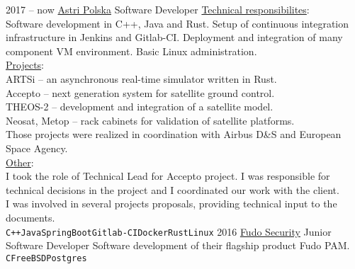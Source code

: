 \documentclass[10pt]{developercv} %
\begin{document}
\begin{entrylist}
	\entry
		{2017 -- now}
		{\href{https://astripolska.pl/}{Astri Polska}}
		{Software Developer}
        {\underline{Technical responsibilites}:\\
        Software development in C++, Java and Rust. Setup of continuous integration infrastructure in Jenkins and Gitlab-CI. Deployment and integration of many component VM environment. Basic Linux administration.\\
        \underline{Projects}:\\
        ARTSi -- an asynchronous real-time simulator written in Rust.\\
        Accepto -- next generation system for satellite ground control.\\
        THEOS-2 -- development and integration of a satellite model.\\
        Neosat, Metop -- rack cabinets for validation of satellite platforms.\\
        Those projects were realized in coordination with Airbus D\&S and European Space Agency.\\
        \underline{Other}:\\
        I took the role of Technical Lead for Accepto project. I was responsible for technical decisions in the project and I coordinated our work with the client.\\
        I was involved in several projects proposals, providing technical input to the documents.
        \\ \texttt{C++}\slashsep\texttt{Java}\slashsep\texttt{SpringBoot}\slashsep\texttt{Gitlab-CI}\slashsep\texttt{Docker}\slashsep\texttt{Rust}\slashsep\texttt{Linux}}
	\entry
		{2016}
		{\href{https://fudosecurity.com/}{Fudo Security}}
		{Junior Software Developer}
	    {Software development of their flagship product Fudo PAM.\\
		\texttt{C}\slashsep\texttt{FreeBSD}\slashsep\texttt{Postgres}}
\end{entrylist}


\begin{minipage}[t]{0.3\textwidth}
\vspace{-\baselineskip}
\begin{barchart}{2.5}
\end{barchart}
\end{minipage}
\begin{minipage}[t]{0.3\textwidth}
\vspace{-\baselineskip}
\begin{barchart}{2.5}
\end{barchart}
\end{minipage}
\begin{minipage}[t]{0.3\textwidth}
\vspace{-\baselineskip}
\begin{barchart}{2.5}
\end{barchart}
\end{minipage}
\end{document}
